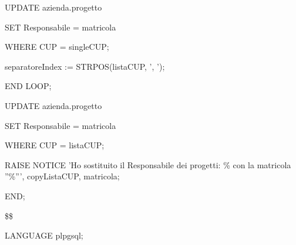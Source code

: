 \begin{flushleft}
\begin{description}
\begin{description}
\begin{description}
                            \vspace{0.5cm}

                            \item UPDATE azienda.progetto
                            \item SET Responsabile = matricola
                            \item WHERE CUP = singleCUP;
                            
                            \vspace{0.5cm}

                            \item separatoreIndex := STRPOS(listaCUP, ', ');
                        \end{description}
                        \item END LOOP;
                        \item UPDATE azienda.progetto
                        \item SET Responsabile = matricola
                        \item WHERE CUP = listaCUP;
                        \item RAISE NOTICE 'Ho sostituito il Responsabile dei progetti: \% con la matricola ''\%''', copyListaCUP, matricola;
                    \end{description}
                    \item END;
                    \item \$\$
                    \item LANGUAGE plpgsql;
                \end{description}
            \end{flushleft}
        \normalfont


